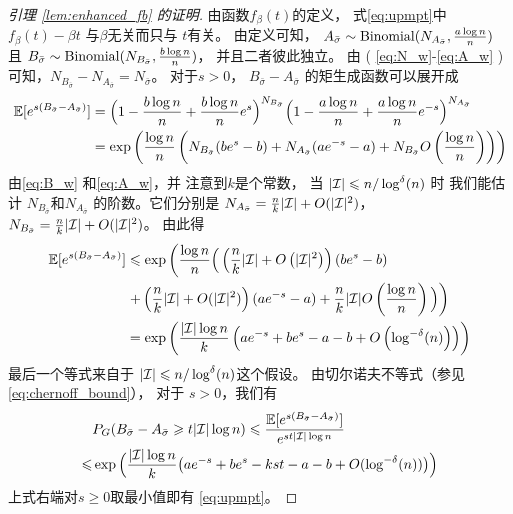 \begin{proof}[引理 \ref{lem:enhanced_fb} 的证明]
  由函数$f_{\beta}(t)$的定义，
  式\eqref{eq:upmpt}中
  $f_{\beta}(t) - \beta t$ 与$\beta$无关而只与
  $t$有关。
	由定义可知，
  $A_{\bar{\sigma}}\sim \operatorname{Binomial}(N_{A_{\bar{\sigma}}},\frac{a\log n}{n})$
  且
	$B_{\bar{\sigma}}\sim\operatorname{Binomial}(N_{B_{\bar{\sigma}}},\frac{b\log n}{n})$，
  并且二者彼此独立。
  由 ( \ref{eq:N_w}-\ref{eq:A_w} )可知，$N_{B_{\bar{\sigma}}} - N_{A_{\bar{\sigma}}}
  = N_{\bar{\sigma}}$。
  对于$s>0$，
  $B_{\bar{\sigma}}-A_{\bar{\sigma}}$ 的矩生成函数可以展开成
	\begin{align}
	 \mathbb{E}[e^{s(B_{\bar{\sigma}}-A_{\bar{\sigma}})}] 
	& =\Big(1-\frac{b\log n}{n}+\frac{b\log n}{n} e^s \Big)^{N_{B_{\bar{\sigma}}}}
	\Big(1-\frac{a\log n}{n}+\frac{a\log n}{n} e^{-s} \Big)^{N_{A_{\bar{\sigma}}}}  \notag\\
	& = \exp\left(\frac{\log n}{n}\left(N_{B_{\bar{\sigma}}}
  (be^s - b) + N_{A_{\bar{\sigma}}}(ae^{-s}-a) + N_{B_{\bar{\sigma}}}
  O \left(\frac{\log n}{n} \right) \right) \right)
  \label{eq:exp_s_B_A_sigma}
	\end{align}
	由\eqref{eq:B_w}
  和\eqref{eq:A_w}，并
  注意到$k$是个常数，
  当
  $|\mathcal{I}| \leqslant n/\log^{\delta}(n)$ 时
	我们能估计
  $N_{B_{\bar{\sigma}}}$和$N_{A_{\bar{\sigma}}}$
  的阶数。它们分别是
  $N_{A_{\bar{\sigma}}} = \frac{n}{k}|\mathcal{I}| + O(|\mathcal{I}|^2)$，
	 $N_{B_{\bar{\sigma}}} = \frac{n}{k}|\mathcal{I}| + O(|\mathcal{I}|^2)$。
   由此得
	\begin{align*}
	\mathbb{E}[e^{s(B_{\bar{\sigma}}-A_{\bar{\sigma}})}]
  & \leqslant
	\exp\left(\frac{\log n}{n}\Big( 
    \left(\frac{n}{k}|\mathcal{I}| + O\left(|\mathcal{I}|^2\right)\right)
    (be^s - b) 
    \right.\\
  & \left. \relax 
  + \left(\frac{n}{k} |\mathcal{I}| + O(|\mathcal{I}|^2)\right)(ae^{-s}-a) + \frac{n}{k}|\mathcal{I}|O\left(\frac{\log n}{n} \right) \Big)\right)\\
	&=
   \exp\left(\frac{|\mathcal{I}| \log n}{k}
   \left(a e^{-s}+b e^s-a-b +
	O \left(\log^{-\delta}(n) \right) \right) \right)
	\end{align*}
	最后一个等式来自于
  $ |\mathcal{I}| \leqslant n/\log^{\delta}(n)$这个假设。
	由切尔诺夫不等式（参见 \eqref{eq:chernoff_bound}），
  对于 $s>0$，我们有
	\begin{align*} 
	& P_G(B_{\bar{\sigma}}-A_{\bar{\sigma}}\geqslant t |\mathcal{I}| \log n)\leqslant
	\frac{\mathbb{E}[e^{s(B_{\bar{\sigma}}-A_{\bar{\sigma}})}]}{e^{st |\mathcal{I}|  \log n}}  \\
	\leqslant & \exp\Big(\frac{|\mathcal{I}|\log n}{k} \big(a e^{-s}+b e^s -kst -a-b
	+ O(\log^{-\delta}(n)) \big)\Big) 
	\end{align*}
	上式右端对$s\geq 0$取最小值即有
  \eqref{eq:upmpt}。  
	\end{proof}

